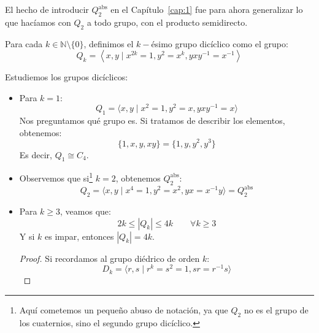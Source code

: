 \noindent
El hecho de introducir $Q_2^{\text{abs}}$ en el Capítulo~\ref{cap:1} fue para ahora generalizar lo que hacíamos con $Q_2$ a todo grupo, con el producto semidirecto.

\begin{definicion}
    Para cada $k\in \mathbb{N}\setminus \{0\}$, definimos el $k-$ésimo grupo dicíclico como el grupo:
    \begin{equation*}
        Q_k = \left\langle x,y \mid x^{2k} = 1, y^2 = x^k, yxy^{-1} = x^{-1}  \right\rangle 
    \end{equation*}
\end{definicion}

\begin{ejemplo}
    Estudiemos los grupos dicíclicos:
    \begin{itemize}
        \item Para $k=1$:
            \begin{equation*}
                Q_1 = \langle x,y\mid x^2 = 1, y^2 = x, yxy^{-1} = x \rangle 
            \end{equation*}
            Nos preguntamos qué grupo es. Si tratamos de describir los elementos, obtenemos:
            \begin{equation*}
                \{1,x,y,xy\} = \{1,y,y^2,y^3\}
            \end{equation*}
            Es decir, $Q_1\cong C_4$.
        \item Observemos que si\footnote{Aquí cometemos un pequeño abuso de notación, ya que $Q_2$ no es el grupo de los cuaternios, sino el segundo grupo dicíclico.} $k=2$, obtenemos $Q_2^\text{abs}$:
            \begin{equation*}
                Q_2 = \langle x,y \mid x^4 = 1, y^2 = x^2, yx = x^{-1}y \rangle  = Q_2^{\text{abs}}
            \end{equation*}
        \item Para $k\geq 3$, veamos que:
            \begin{equation*}
                2k \leq |Q_k| \leq 4k \qquad \forall k\geq 3
            \end{equation*}
            Y si $k$ es impar, entonces $|Q_k| = 4k$.
            \begin{proof}
                Si recordamos al grupo diédrico de orden $k$:
                \begin{equation*}
                    D_k = \langle r,s \mid r^k = s^2 = 1, sr = r^{-1}s \rangle 
                \end{equation*}

\end{proof}
\end{itemize}
\end{ejemplo}
